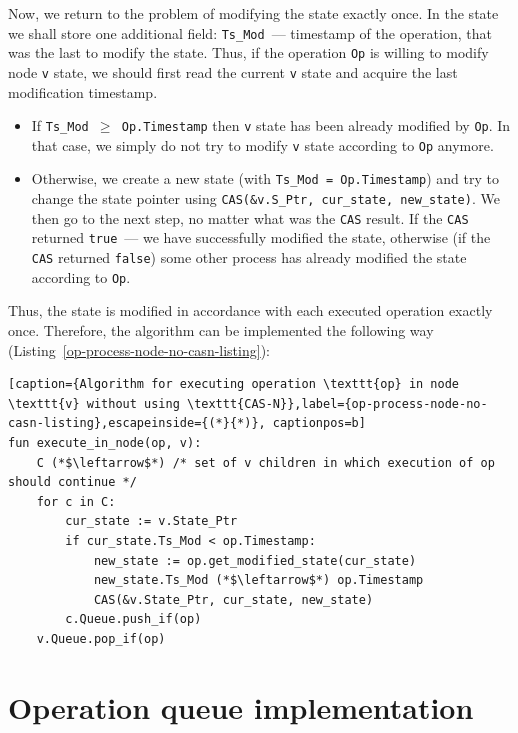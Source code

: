 \documentclass[times, dvipsnames,%
               languages={russian,english} %
              ]{itmo-student-thesis}
\begin{document}
Now, we return to the problem of modifying the state exactly once. In the state we shall store one additional field: \texttt{Ts\_Mod}~--- timestamp of the operation, that was the last to modify the state. Thus, if the operation \texttt{Op} is willing to modify node \texttt{v} state, we should first read the current \texttt{v} state and acquire the last modification timestamp.

\begin{itemize}
    \item If \texttt{Ts\_Mod $\geq$ Op.Timestamp} then \texttt{v} state has been already modified by \texttt{Op}. In that case, we simply do not try to modify \texttt{v} state according to \texttt{Op} anymore.
    
    \item Otherwise, we create a new state (with \texttt{Ts\_Mod = Op.Timestamp}) and try to change the state pointer using \texttt{CAS(\&v.S\_Ptr, cur\_state, new\_state)}. We then go to the next step, no matter what was the \texttt{CAS} result. If the \texttt{CAS} returned \texttt{true}~--- we have successfully modified the state, otherwise (if the \texttt{CAS} returned \texttt{false}) some other process has already modified the state according to \texttt{Op}.
\end{itemize}

\bigbreak

Thus, the state is modified in accordance with each executed operation exactly once. Therefore, the algorithm can be implemented the following way (Listing~\ref{op-process-node-no-casn-listing}):

\renewcommand{\lstlistingname}{Listing}
\begin{lstlisting}[caption={Algorithm for executing operation \texttt{op} in node \texttt{v} without using \texttt{CAS-N}},label={op-process-node-no-casn-listing},escapeinside={(*}{*)}, captionpos=b]
fun execute_in_node(op, v):
    C (*$\leftarrow$*) /* set of v children in which execution of op should continue */
    for c in C:
        cur_state := v.State_Ptr
        if cur_state.Ts_Mod < op.Timestamp:
            new_state := op.get_modified_state(cur_state)
            new_state.Ts_Mod (*$\leftarrow$*) op.Timestamp
            CAS(&v.State_Ptr, cur_state, new_state)
        c.Queue.push_if(op)
    v.Queue.pop_if(op)
\end{lstlisting}

\section{Operation queue implementation}
\end{document}
